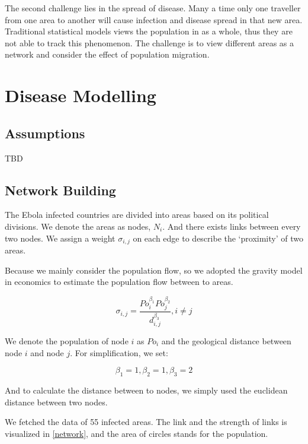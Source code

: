 \documentclass[12pt]{article}
\begin{document}
The second challenge lies in the spread of disease. Many a time only one traveller from one area to another will cause infection and disease spread in that new area. Traditional statistical models views the population in as a whole, thus they are not able to track this phenomenon. The challenge is to view different areas as a network and consider the effect of population migration.


\section{Disease Modelling}
\label{dmodel}
\subsection{Assumptions}

TBD

\subsection{Network Building}

The Ebola infected countries are divided into areas based on its
 political divisions. We denote the areas as nodes, $N_i$. And there exists links between every two nodes. We assign a weight $\sigma_{i,j}$ on each edge to describe the `proximity' of two areas. 
 
Because we mainly consider the population flow, so we adopted the gravity model\cite{anderson2010gravity}\cite{karemera2000gravity} in economics to estimate the population flow between to areas.

$$\sigma_{i,j} = \frac{Po_i^{\beta_1}Po_j^{\beta_2}}{d_{i,j}^{\beta_3}}, i \neq j$$

We denote the population of node $i$ as $Po_i$ and the geological distance between node $i$ and node $j$. For simplification, we set:

$$\beta_1 = 1, \beta_2 = 1, \beta_3 = 2$$

And to calculate the distance between to nodes, we simply used the euclidean distance between two nodes.

We fetched the data of 55 infected areas. The link and the strength of links is visualized in \ref{network}, and the area of circles stands for the population.
\end{document}
